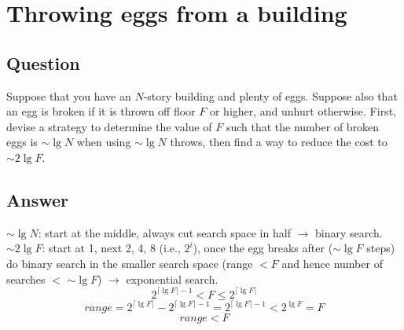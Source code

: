 \section{Throwing eggs from a building}

\subsection*{Question}
Suppose that you have an $N$-story building and
plenty of eggs. Suppose also that an egg is broken if it is thrown off floor $F$ or higher,
and unhurt otherwise. First, devise a strategy to determine the value of $F$ such that the
number of broken eggs is $\sim\lg{N}$ when using $\sim\lg{N}$ throws, then find a way to reduce the
cost to $\sim2\lg{F}$.

\subsection*{Answer}
$\sim\lg{N}$: start at the middle, always cut search space in half $\rightarrow$ binary search.\\
$\sim2\lg{F}$: start at 1, next 2, 4, 8 (i.e., $2^i$), once the egg breaks after ($\sim$$\lg{F}$ steps)
do binary search in the smaller search space (range $<F$ and hence number of searches $<$ $\sim\lg{F}$)
$\rightarrow$ exponential search.
\[2^{\lceil \lg{F} \rceil - 1} < F \leqslant 2^{\lceil \lg{F} \rceil}\]
\[range = 2^{\lceil \lg{F} \rceil} - 2^{\lceil \lg{F} \rceil - 1}
= 2^{\lceil \lg{F} \rceil - 1} < 2^{\lg{F}} = F\]
\[range < F\]
